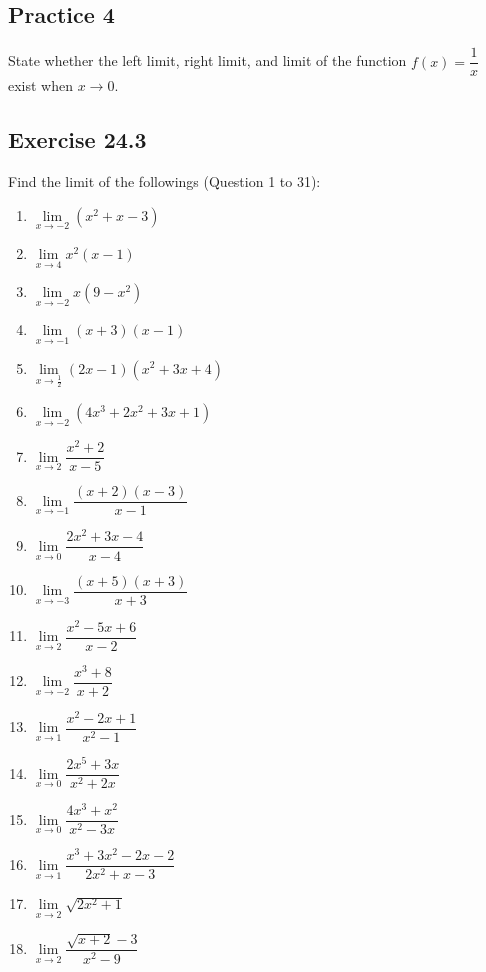 \documentclass[12pt]{report}
\begin{document}
\subsection{Practice 4}

State whether the left limit, right limit, and limit of the function $f (x) =
  \dfrac{1}{x}$ exist when $x \to 0$.

\subsection{Exercise 24.3}

\setlength{\columnseprule}{1pt}
\setlength{\columnsep}{24pt}
\begin{multicols}{2}
  Find the limit of the followings (Question 1 to 31):

  \begin{enumerate}
    \item $\lim\limits_{x\to-2}\left(x^{2}+x-3\right)$
    \item $\lim\limits_{x\to4}x^{2}(x-1)$
    \item $\lim\limits_{x\to-2}x\left(9-x^{2}\right)$
    \item $\lim\limits_{x\to-1}(x+3)\left(x-1\right)$
    \item $\lim\limits_{x\to{\frac{1}{2}}}\left(2x-1\right)\left(x^{2}+3x+4\right)$
    \item $\lim\limits_{x\to-2}\left(4x^{3}+2x^{2}+3x+1\right)$
    \item $\lim\limits_{x\to2}{\dfrac{x^{2}+2}{x-5}}$
    \item $\lim\limits_{x\to-1}{\dfrac{(x+2)(x-3)}{x-1}}$
    \item $\lim\limits_{x\to0}{\dfrac{2x^{2}+3x-4}{x-4}}$
    \item $\lim\limits_{x\to-3}\dfrac{(x+5)(x+3)}{x+3}$
    \item $\lim\limits_{x\to2}{\dfrac{x^{2}-5x+6}{x-2}}$
    \item $\lim\limits_{x\to-2}{\dfrac{x^{3}+8}{x+2}}$
    \item $\lim\limits_{x\to1}{\dfrac{x^{2}-2x+1}{x^{2}-1}}$
    \item $\lim\limits_{x\to0}{\dfrac{2x^{5}+3x}{x^{2}+2x}}$
    \item $\lim\limits_{x\to0}{\dfrac{4x^{3}+x^{2}}{x^{2}-3x}}$
    \item $\lim\limits_{x\to1}{\dfrac{x^{3}+3x^{2}-2x-2}{2x^{2}+x-3}}$
    \item $\lim\limits_{x\to2}{\sqrt{2x^{2}+1}}$
    \item $\lim\limits_{x\to2}{\dfrac{{\sqrt{x+2}}-3}{x^{2}-9}}$

\end{enumerate}
\end{multicols}
\end{document}
